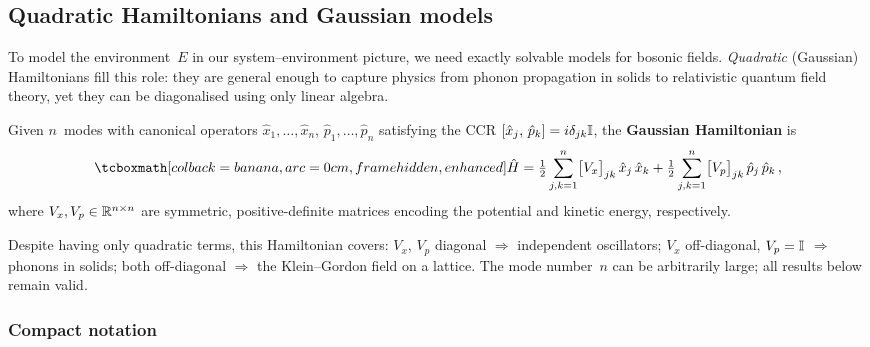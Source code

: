 

\subsection{Quadratic Hamiltonians and Gaussian models}%
\label{sec:gaussian-models}

To model the environment~$E$ in our system--environment picture, we
need exactly solvable models for bosonic fields.  \emph{Quadratic}
(Gaussian) Hamiltonians fill this role: they are general enough to
capture physics from phonon propagation in solids to relativistic
quantum field theory, yet they can be diagonalised using only linear
algebra.

\begin{definition}%
\label{def:gaussian-hamiltonian}
  Given $n$~modes with canonical operators
  $\hat{x}_1,\ldots,\hat{x}_n$, $\hat{p}_1,\ldots,\hat{p}_n$
  satisfying the CCR
  $[\hat{x}_j,\,\hat{p}_k] = i\delta_{jk}\mathbb{I}$, the
  \textbf{Gaussian Hamiltonian} is
  \begin{equation}\label{eq:gaussian-H}
    \eqbox{\hat{H}
    = \tfrac{1}{2}\sum_{j,k=1}^{n}
      \bigl[V_x\bigr]_{jk}\,\hat{x}_j\,\hat{x}_k
    + \tfrac{1}{2}\sum_{j,k=1}^{n}
      \bigl[V_p\bigr]_{jk}\,\hat{p}_j\,\hat{p}_k}\,,
  \end{equation}
  where $V_x, V_p \in \mathbb{R}^{n\times n}$ are symmetric, positive-definite
  matrices encoding the potential and kinetic energy, respectively.
\end{definition}

\begin{intuition}
  Despite having only quadratic terms, this Hamiltonian covers:
  $V_x$, $V_p$ diagonal $\Rightarrow$ independent oscillators;
  $V_x$ off-diagonal, $V_p = \mathbb{I}$ $\Rightarrow$ phonons in solids;
  both off-diagonal $\Rightarrow$ the Klein--Gordon field on a lattice.
  The mode number~$n$ can be arbitrarily large; all results below
  remain valid.
\end{intuition}

\subsubsection{Compact notation}

